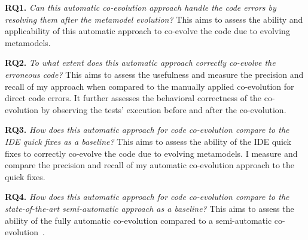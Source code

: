 \blue{}
\textbf{RQ1.}  \emph{Can this automatic co-evolution approach handle the code errors by resolving them after the metamodel evolution?} This aims to assess the ability and applicability of this automatic approach to co-evolve the code due to evolving metamodels.  %


\textbf{RQ2.} \emph{To what extent does this automatic approach correctly co-evolve the erroneous code?} This aims to assess the usefulness and measure the precision and recall of my approach when compared to the manually applied co-evolution for direct code errors. It further assesses the behavioral correctness of the co-evolution by observing the tests' execution before and after the co-evolution. %


\textbf{RQ3.} \emph{How does this automatic approach for code co-evolution compare to the IDE quick fixes as a baseline?} 
This aims to assess the ability of the IDE quick fixes to correctly co-evolve the code due to evolving metamodels. I measure and compare the precision and recall of my automatic co-evolution approach to the quick fixes.   

\textbf{RQ4.} \emph{How does this automatic approach for code co-evolution compare to the state-of-the-art semi-automatic approach as a baseline?} 
This aims to assess the ability of the fully automatic co-evolution compared to a semi-automatic co-evolution~\cite{Khelladi2020}. 

